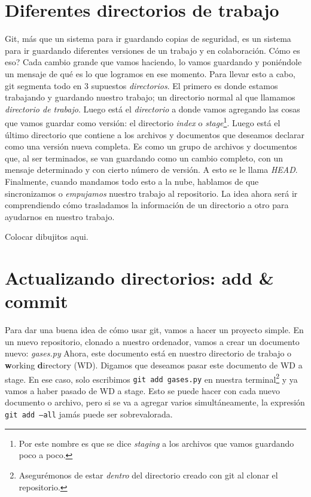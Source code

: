 \documentclass[10pt,letterpaper]{article}
\newcommand{\inlinecode}[1]{
\colorbox{light-gray}{\texttt{#1}}
}
\begin{document}
\section{Diferentes directorios de trabajo}
Git, m\'as que un sistema para ir guardando copias de seguridad, es un sistema para ir guardando diferentes versiones de un trabajo y en colaboraci\'on. C\'omo es eso? Cada cambio grande que vamos haciendo, lo vamos guardando y poni\'endole un mensaje de qu\'e es lo que logramos en ese momento. Para llevar esto a cabo, git segmenta todo en 3 supuestos \textit{directorios}. El primero es donde estamos trabajando y guardando nuestro trabajo; un directorio normal al que llamamos \emph{directorio de trabajo}. Luego est\'a el \textit{directorio} a donde vamos agregando las cosas que vamos guardar como versi\'on: el directorio \emph{index} o \emph{stage}\footnote{Por este nombre es que se dice \emph{staging} a los archivos que vamos guardando poco a poco.}. Luego est\'a el \'ultimo directorio que contiene a los archivos y documentos que deseamos declarar como una versi\'on nueva completa. Es como un grupo de archivos y documentos que, al ser terminados, se van guardando como un cambio completo, con un mensaje determinado y con cierto n\'umero de versi\'on. A esto se le llama \emph{HEAD}. Finalmente, cuando mandamos todo esto a la nube, hablamos de que sincronizamos o \emph{empujamos} nuestro trabajo al repositorio. La idea ahora ser\'a ir comprendiendo c\'omo trasladamos la informaci\'on de un directorio a otro para ayudarnos en nuestro trabajo.

Colocar dibujitos aqui.

\section{Actualizando directorios: add \& commit}
Para dar una buena idea de c\'omo usar git, vamos a hacer un proyecto simple. En un nuevo repositorio, clonado a nuestro ordenador, vamos a crear un documento nuevo: \textit{gases.py} Ahora, este documento est\'a en nuestro directorio de trabajo o \textbf{w}orking \textbf{d}irectory (WD). Digamos que deseamos pasar este documento de WD a stage. En ese caso, solo escribimos \inlinecode{git add gases.py} en nuestra terminal\footnote{Asegur\'emonos de estar \emph{dentro} del directorio creado con git al clonar el repositorio.} y ya vamos a haber pasado de WD a stage. Esto se puede hacer con cada nuevo documento o archivo, pero si se va a agregar varios simult\'aneamente, la expresi\'on \inlinecode{git add --all} jam\'as puede ser sobrevalorada.\\
\end{document}
